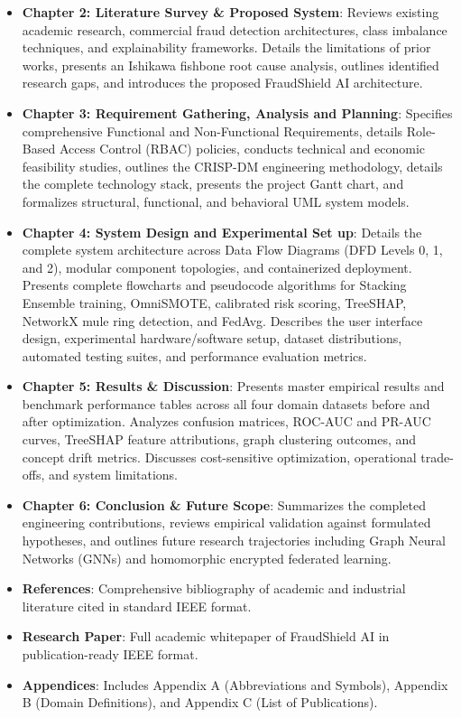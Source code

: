 \documentclass[12pt,a4paper,oneside]{report}
\begin{document}
\begin{itemize}[leftmargin=0.35in]
\item \textbf{Chapter 2: Literature Survey \& Proposed System}: Reviews existing academic research, commercial fraud detection architectures, class imbalance techniques, and explainability frameworks. Details the limitations of prior works, presents an Ishikawa fishbone root cause analysis, outlines identified research gaps, and introduces the proposed FraudShield AI architecture.
\item \textbf{Chapter 3: Requirement Gathering, Analysis and Planning}: Specifies comprehensive Functional and Non-Functional Requirements, details Role-Based Access Control (RBAC) policies, conducts technical and economic feasibility studies, outlines the CRISP-DM engineering methodology, details the complete technology stack, presents the project Gantt chart, and formalizes structural, functional, and behavioral UML system models.
\item \textbf{Chapter 4: System Design and Experimental Set up}: Details the complete system architecture across Data Flow Diagrams (DFD Levels 0, 1, and 2), modular component topologies, and containerized deployment. Presents complete flowcharts and pseudocode algorithms for Stacking Ensemble training, OmniSMOTE, calibrated risk scoring, TreeSHAP, NetworkX mule ring detection, and FedAvg. Describes the user interface design, experimental hardware/software setup, dataset distributions, automated testing suites, and performance evaluation metrics.
\item \textbf{Chapter 5: Results \& Discussion}: Presents master empirical results and benchmark performance tables across all four domain datasets before and after optimization. Analyzes confusion matrices, ROC-AUC and PR-AUC curves, TreeSHAP feature attributions, graph clustering outcomes, and concept drift metrics. Discusses cost-sensitive optimization, operational trade-offs, and system limitations.
\item \textbf{Chapter 6: Conclusion \& Future Scope}: Summarizes the completed engineering contributions, reviews empirical validation against formulated hypotheses, and outlines future research trajectories including Graph Neural Networks (GNNs) and homomorphic encrypted federated learning.
\item \textbf{References}: Comprehensive bibliography of academic and industrial literature cited in standard IEEE format.
\item \textbf{Research Paper}: Full academic whitepaper of FraudShield AI in publication-ready IEEE format.
\item \textbf{Appendices}: Includes Appendix A (Abbreviations and Symbols), Appendix B (Domain Definitions), and Appendix C (List of Publications).
\end{itemize}
\end{document}
